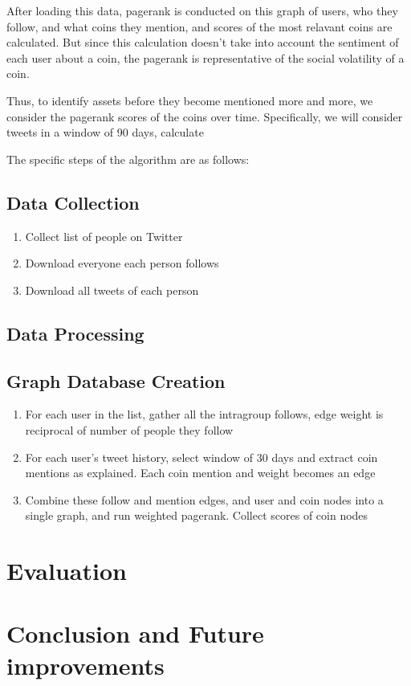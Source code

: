 \documentclass{article}
\begin{document}
After loading this data, pagerank is conducted on this graph of users, who they follow, and what coins they mention, and scores of the most relavant coins are calculated. But since this calculation doesn't take into account the sentiment of each user about a coin, the pagerank is representative of the social volatility of a coin.

Thus, to identify assets before they become mentioned more and more, we consider the pagerank scores of the coins over time. Specifically, we will consider tweets in a window of 90 days, calculate 


The specific steps of the algorithm are as follows:

\subsection{Data Collection}

\begin{enumerate}
    \item Collect list of people on Twitter

    \item Download everyone each person follows
    
    \item Download all tweets of each person
\end{enumerate}

\subsection{Data Processing}

\subsection{Graph Database Creation}

\begin{enumerate}
    \item For each user in the list, gather all the intragroup follows, edge weight is reciprocal of number of people they follow
    \item For each user's tweet history, select window of 30 days and extract coin mentions as explained. Each coin mention and weight becomes an edge 
    \item Combine these follow and mention edges, and user and coin nodes into a single graph, and run weighted pagerank. Collect scores of coin nodes
\end{enumerate}



\section{Evaluation}



\section{Conclusion and Future improvements}
\end{document}
